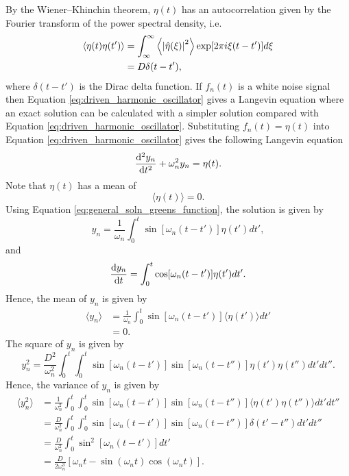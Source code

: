 By the Wiener–Khinchin theorem, $\eta(t)$ has an autocorrelation given by the Fourier transform of the power spectral density, i.e.
\begin{equation}
    \label{eq:autocorrelation}
    \begin{aligned}
    \langle\eta(t) \eta(t')\rangle &= \int_{\infty}^\infty \left\langle\abs{\hat{\eta}(\xi)}^2\right\rangle\exp[2\pi i \xi (t - t')] d\xi \\
    &=D\delta(t-t'),
    \end{aligned}
\end{equation}
where $\delta(t-t')$ is the Dirac delta function. 
If $f_n(t)$ is a white noise signal then Equation \eqref{eq:driven_harmonic_oscillator} gives a Langevin equation where an exact solution can be calculated with a simpler solution compared with Equation \eqref{eq:driven_harmonic_oscillator}. Substituting $f_n(t)=\eta(t)$ into Equation \eqref{eq:driven_harmonic_oscillator} gives the following Langevin equation
\begin{equation}
    \dv[2]{y_n}{t} + \omega_n^2 y_n = \eta(t).
\end{equation}
Note that $\eta(t)$ has a mean of
\begin{equation}
    \langle\eta(t)\rangle=0.
\end{equation}
Using Equation \eqref{eq:general_soln_greens_function}, the solution is given by
\begin{equation}
    y_n = \frac{1}{\omega_n}\int_0^t\sin[\omega_n(t-t')]\eta(t')dt',
\end{equation}
and
\begin{equation}
    \dv{y_n}{t} = \int_0^t\cos[\omega_n(t-t')]\eta(t')dt'.
\end{equation}
Hence, the mean of $y_n$ is given by
\begin{equation}
    \begin{aligned}
    \langle y_n \rangle &= \frac{1}{\omega_n}\int_0^t\sin[\omega_n(t-t')]\langle \eta(t') \rangle dt' \\
    &= 0.
    \end{aligned}
\end{equation}
The square of $y_n$ is given by
\begin{equation}
    y_n^2 = \frac{D^2}{\omega_n^2}\int_0^t\int_0^t\sin[\omega_n(t-t')]\sin[\omega_n(t-t'')]\eta(t')\eta(t'')dt'dt''.
\end{equation}
Hence, the variance of $y_n$ is given by
\begin{equation}
    \label{eq:variance_exact_red_force}
    \begin{aligned}
    \langle y_n^2 \rangle &= \frac{1}{\omega_n^2}\int_0^t\int_0^t\sin[\omega_n(t-t')]\sin[\omega_n(t-t'')]\langle \eta(t')\eta(t'')\rangle dt'dt'' \\
    &= \frac{D}{\omega_n^2}\int_0^t\int_0^t\sin[\omega_n(t-t')]\sin[\omega_n(t-t'')]\delta(t'-t'') dt'dt'' \\
    &= \frac{D}{\omega_n^2}\int_0^t\sin^2[\omega_n(t-t')] dt' \\
    &=\frac{D}{2\omega_n^3}[\omega_n t - \sin(\omega_n t) \cos(\omega_n t)].
    \end{aligned}
\end{equation}
